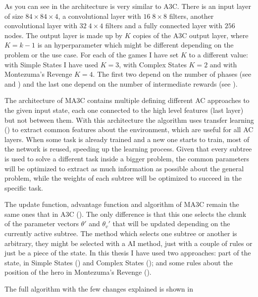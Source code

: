 As you can see in  the architecture is very similar to \ac{A3C}.
There is an input layer of size $84 \times 84 \times 4$, a convolutional layer with $16\; 8 \times 8$ filters, another
convolutional layer with $32 \; 4 \times 4$ filters and a fully connected layer with $256$ nodes.
The output layer is made up by $K$ copies of the \ac{A3C} output layer, where $K = k-1$ is an hyperparameter which might be
different depending on the problem or the use case.
For each of the games I have set $K$ to a different value: with Simple States I have used $K=3$, with Complex States
$K=2$ and with Montezuma's Revenge $K=4$.
The first two depend on the number of phases (see  and ) and the last one
depend on the number of intermediate rewards (see ).

The architecture of \ac{MA3C} contains multiple  defining different \acl{AC} approaches to the given input state,
each one connected to the high level features (last layer) but not between them.
With this architecture the algorithm uses transfer learning () to extract common features
about the environment, which are useful for all \ac{AC} layers.
When some task is already trained and a new one starts to train, most of the network is reused, speeding up the learning
process.
Given that every subtree is used to solve a different task inside a bigger problem, the common parameters will be optimized to
extract as much information as possible about the general problem, while the weights of each subtree will be optimized to
succeed in the specific task.

The update function, advantage function and algorithm of \ac{MA3C} remain the same ones that in \ac{A3C} ().
The only difference is that this one selects the chunk of the parameter vectors $\theta'$ and $\theta_{v}'$ that will be updated
depending on the currently active subtree.
The method which selects one subtree or another is arbitrary, they might be selected with a \ac{AI} method, just
with a couple of rules or just be a piece of the state.
In this thesis I have used two approaches: part of the state, in Simple States () and Complex States
(); and some rules about the position of the hero in Montezuma's Revenge ().

The full algorithm with the few changes explained is shown in 

